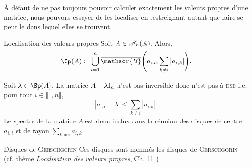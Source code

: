 À défaut de ne pas toujours pouvoir calculer exactement les valeurs propres d'une matrice, nous pouvons essayer de les localiser en restreignant autant que faire se peut le  dans lequel elles se trouvent.

\begin{theo}{Localisation des valeurs propres} 
    Soit $A \in \mathscr{M}_n(\mathbb{K})$. Alors, $$\Sp(A) \subset \bigcup\limits_{i=1}^{n} \overline{\mathscr{B}} \Bigg( a_{i,i}, \sum\limits_{k \not = i} |a_{i,k}| \Bigg).$$
\end{theo}

\begin{preuve}
    Soit $\lambda \in \Sp(A)$. La matrice $A - \lambda \mathrm{I}_n$ n'est pas inversible \note 
    donc n'est pas à \textsc{dsd} i.e. pour tout $i \in \llbracket 1, n \rrbracket$,
    $$|a_{i,i} - \lambda| \leqslant \sum_{k \not= i} |a_{i,k}|.$$
    Le spectre de la matrice $A$ est donc inclus dans la réunion des disques de centre $a_{i,i}$ et de rayon $\sum\limits_{k \not=i} a_{i,k}$.
\end{preuve} 

\begin{defi}{Disques de \textsc{Gerschgorin}}
    Ces disques sont nommés les disques de \textsc{Gerschgorin} \note (cf. thème \textit{Localisation des valeurs propres}, Ch. 11 \cite{acamanes})
\end{defi}




